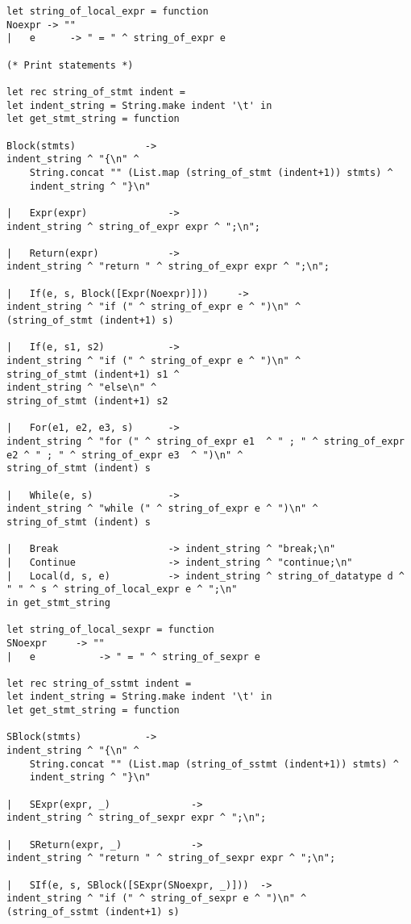 \begin{verbatim}
let string_of_local_expr = function
Noexpr -> ""
|  	e 	   -> " = " ^ string_of_expr e

(* Print statements *)

let rec string_of_stmt indent =
let indent_string = String.make indent '\t' in
let get_stmt_string = function 

Block(stmts) 			-> 
indent_string ^ "{\n" ^ 
	String.concat "" (List.map (string_of_stmt (indent+1)) stmts) ^ 
	indent_string ^ "}\n"

| 	Expr(expr) 				-> 
indent_string ^ string_of_expr expr ^ ";\n";

| 	Return(expr) 			-> 
indent_string ^ "return " ^ string_of_expr expr ^ ";\n";

| 	If(e, s, Block([Expr(Noexpr)])) 	-> 
indent_string ^ "if (" ^ string_of_expr e ^ ")\n" ^ 
(string_of_stmt (indent+1) s)

| 	If(e, s1, s2) 			-> 
indent_string ^ "if (" ^ string_of_expr e ^ ")\n" ^ 
string_of_stmt (indent+1) s1 ^ 
indent_string ^ "else\n" ^ 
string_of_stmt (indent+1) s2

| 	For(e1, e2, e3, s) 		-> 
indent_string ^ "for (" ^ string_of_expr e1  ^ " ; " ^ string_of_expr e2 ^ " ; " ^ string_of_expr e3  ^ ")\n" ^ 
string_of_stmt (indent) s

| 	While(e, s) 			-> 
indent_string ^ "while (" ^ string_of_expr e ^ ")\n" ^ 
string_of_stmt (indent) s

|  	Break					-> indent_string ^ "break;\n"
|  	Continue				-> indent_string ^ "continue;\n"
|   Local(d, s, e) 			-> indent_string ^ string_of_datatype d ^ " " ^ s ^ string_of_local_expr e ^ ";\n"
in get_stmt_string

let string_of_local_sexpr = function
SNoexpr 	-> ""
|  	e 	   		-> " = " ^ string_of_sexpr e

let rec string_of_sstmt indent =
let indent_string = String.make indent '\t' in
let get_stmt_string = function 

SBlock(stmts) 			-> 
indent_string ^ "{\n" ^ 
	String.concat "" (List.map (string_of_sstmt (indent+1)) stmts) ^ 
	indent_string ^ "}\n"

| 	SExpr(expr, _) 				-> 
indent_string ^ string_of_sexpr expr ^ ";\n";

| 	SReturn(expr, _) 			-> 
indent_string ^ "return " ^ string_of_sexpr expr ^ ";\n";

| 	SIf(e, s, SBlock([SExpr(SNoexpr, _)])) 	-> 
indent_string ^ "if (" ^ string_of_sexpr e ^ ")\n" ^ 
(string_of_sstmt (indent+1) s)


\end{verbatim}
